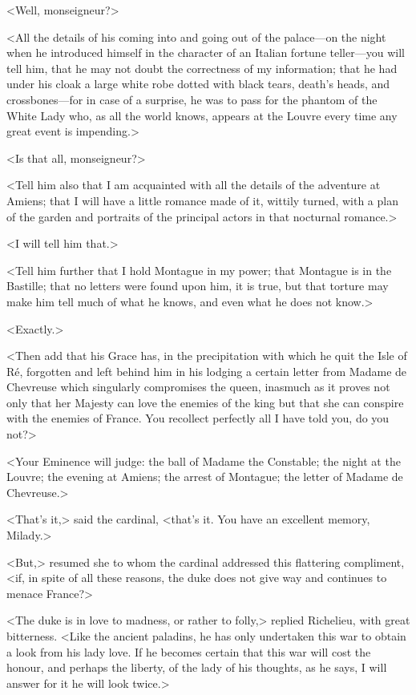 <Well, monseigneur?> 

<All the details of his coming into and going out of the palace---on the night when he introduced himself in the character of an Italian fortune teller---you will tell him, that he may not doubt the correctness of my information; that he had under his cloak a large white robe dotted with black tears, death's heads, and crossbones---for in case of a surprise, he was to pass for the phantom of the White Lady who, as all the world knows, appears at the Louvre every time any great event is impending.> 

<Is that all, monseigneur?> 

<Tell him also that I am acquainted with all the details of the adventure at Amiens; that I will have a little romance made of it, wittily turned, with a plan of the garden and portraits of the principal actors in that nocturnal romance.> 

<I will tell him that.> 

<Tell him further that I hold Montague in my power; that Montague is in the Bastille; that no letters were found upon him, it is true, but that torture may make him tell much of what he knows, and even what he does not know.> 

<Exactly.> 

<Then add that his Grace has, in the precipitation with which he quit the Isle of Ré, forgotten and left behind him in his lodging a certain letter from Madame de Chevreuse which singularly compromises the queen, inasmuch as it proves not only that her Majesty can love the enemies of the king but that she can conspire with the enemies of France. You recollect perfectly all I have told you, do you not?> 

<Your Eminence will judge: the ball of Madame the Constable; the night at the Louvre; the evening at Amiens; the arrest of Montague; the letter of Madame de Chevreuse.> 

<That's it,> said the cardinal, <that's it. You have an excellent memory, Milady.> 

<But,> resumed she to whom the cardinal addressed this flattering compliment, <if, in spite of all these reasons, the duke does not give way and continues to menace France?> 

<The duke is in love to madness, or rather to folly,> replied Richelieu, with great bitterness. <Like the ancient paladins, he has only undertaken this war to obtain a look from his lady love. If he becomes certain that this war will cost the honour, and perhaps the liberty, of the lady of his thoughts, as he says, I will answer for it he will look twice.> 

